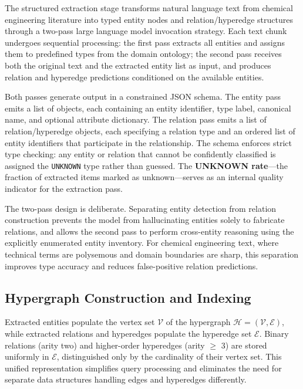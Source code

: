 The structured extraction stage transforms natural language text from chemical engineering literature into typed entity nodes and relation/hyperedge structures through a two-pass large language model invocation strategy. Each text chunk undergoes sequential processing: the first pass extracts all entities and assigns them to predefined types from the domain ontology; the second pass receives both the original text and the extracted entity list as input, and produces relation and hyperedge predictions conditioned on the available entities.

Both passes generate output in a constrained JSON schema. The entity pass emits a list of objects, each containing an entity identifier, type label, canonical name, and optional attribute dictionary. The relation pass emits a list of relation/hyperedge objects, each specifying a relation type and an ordered list of entity identifiers that participate in the relationship. The schema enforces strict type checking: any entity or relation that cannot be confidently classified is assigned the \texttt{UNKNOWN} type rather than guessed. The \textbf{UNKNOWN rate}---the fraction of extracted items marked as unknown---serves as an internal quality indicator for the extraction pass.

The two-pass design is deliberate. Separating entity detection from relation construction prevents the model from hallucinating entities solely to fabricate relations, and allows the second pass to perform cross-entity reasoning using the explicitly enumerated entity inventory. For chemical engineering text, where technical terms are polysemous and domain boundaries are sharp, this separation improves type accuracy and reduces false-positive relation predictions.

\subsection{Hypergraph Construction and Indexing}
\label{subsec:construction}

Extracted entities populate the vertex set $\mathcal{V}$ of the hypergraph $\mathcal{H} = (\mathcal{V}, \mathcal{E})$, while extracted relations and hyperedges populate the hyperedge set $\mathcal{E}$. Binary relations (arity two) and higher-order hyperedges (arity $\geq$ 3) are stored uniformly in $\mathcal{E}$, distinguished only by the cardinality of their vertex set. This unified representation simplifies query processing and eliminates the need for separate data structures handling edges and hyperedges differently.

